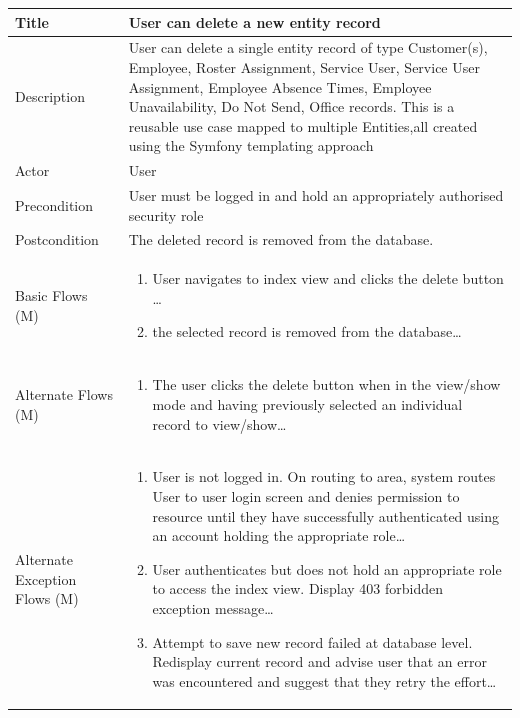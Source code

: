 \documentclass[a4paper,12pt]{article}
\newcommand\addrow[2]{#1 &#2\\ }
\newcommand\addheading[2]{#1 &#2\\ \hline}
\newcommand\tabularhead{\begin{tabular}{lp{8cm}}
\hline
}
\newcommand\addmulrow[2]{ \begin{minipage}[t][][t]{2.5cm}#1\end{minipage}%
   &\begin{minipage}[t][][t]{8cm}
    \begin{enumerate} #2   \end{enumerate}
    \end{minipage}\\ }
\newenvironment{usecase}{\tabularhead}
{\hline\end{tabular}}
\begin{document}
\begin{samepage}
\begin{usecase}
    \addheading{Title}{User can delete a new entity record }
  \addheading{Description}{User can delete a single entity record of type Customer(s), Employee, Roster Assignment, Service User, Service User Assignment, Employee Absence Times, Employee Unavailability, Do Not Send, Office records. This is a reusable use case mapped to multiple Entities,all created using the Symfony templating approach}
  \addheading{Actor}{User} 
  \addrow{Precondition}{User must be logged in and hold an appropriately authorised security role}
  \addrow{Postcondition}{The deleted record is removed from the database.}
  \addmulrow{Basic Flows (M)}{\item User navigates to index view and clicks the delete button \ldots
  \item the selected record is removed from the database\ldots}
  \addmulrow{Alternate  Flows (M)}{\item The user clicks the delete button when in the view/show mode and having previously selected an individual record to view/show\ldots}
  \addmulrow{Alternate Exception Flows (M)}{\item User is not logged in. On routing to area, system routes User to user login screen and denies permission to resource until they have successfully authenticated using an account holding the appropriate role\ldots
                                                                      \item User authenticates but does not hold an appropriate role to access the index view. Display 403 forbidden exception message\ldots
                                                                      \item Attempt to save new record failed at database level. Redisplay current record and advise user that an error was encountered and suggest that they retry the effort\ldots}

\end{usecase}



\end{samepage}
\end{document}
